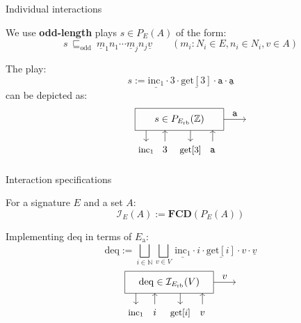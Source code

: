 \documentclass[aspectratio=141]{beamer}
\newcommand{\kw}[1]{\ensuremath{ \mathrm{#1} }}
\newcommand{\deqpic}[3]{%
  \begin{tikzpicture}[scale=0.4]
    \draw (-4,-1) rectangle (4,1);
    \node (x) at (0,0) {$#1$};
    \draw[->] (-3, -1) -- (-3, -2);
    \node[anchor=base] at (-3, -3) {\small $\kw{inc}_1$};
    \draw[<-] (-1.3, -1) -- (-1.3, -2);
    \node[anchor=base] at (-1.3, -3) {$#2$};
    \draw[->] (1, -1) -- (1, -2);
    \node[anchor=base] at (1, -3) {\small $\kw{get}[#2]$};
    \draw[<-] (3, -1) -- (3, -2);
    \node[anchor=base] at (3, -3) {$#3$};
    \draw[->] (4,0) -- node[above] {$#3$} (6,0);
  \end{tikzpicture}%
}
\begin{document}
\begin{frame}{Individual interactions} %
\begin{definition}[Plays]
We use \textbf{odd-length} plays $s \in P_E(A)$ of the form:
\[
  s \: \sqsubseteq_\kw{odd} \:
    \underline{m}_1 n_1
    \cdots
    \underline{m}_j n_j
    \underline{v}
  \qquad
  (m_i \mathop{:} N_i \in E, n_i \in N_i, v \in A)
\]
\end{definition}
\pause
\begin{example}
  The play:
  \[
    s :=
    \underline{\kw{inc}_1} \cdot 3 \cdot
    \underline{\kw{get}[3]} \cdot \mathtt{a} \cdot
    \underline{\mathtt{a}}
  \]
  can be depicted as:
  \[
    \qquad
    \deqpic{s \in {P}_{E_\kw{rb}}(\mathbb{Z})}{3}{\mathtt{a}}
  \]
\end{example}
\end{frame}

\begin{frame}{Interaction specifications} %
  \begin{definition}
    For a signature $E$ and a set $A$:
    \[
      \mathcal{I}_E(A) := \mathbf{FCD}(P_E(A))
    \]
  \end{definition}
  \pause
  \begin{example}
    Implementing $\kw{deq}$ in terms of $E_\kw{a}$:
    \[
      \kw{deq} :=
        \bigsqcup_{i \in \mathbb{N}}
        \bigsqcup_{v \in V}
          \, \underline{\kw{inc}_1} \cdot i \cdot
             \underline{\kw{get}[i]} \cdot v \cdot \underline{v}
    \]
    \[
      \deqpic{\kw{deq} \in \mathcal{I}_{E_\kw{rb}}(V)}{i}{v}
    \]
  \end{example}
\end{frame}
\end{document}
